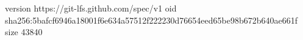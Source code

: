 version https://git-lfs.github.com/spec/v1
oid sha256:5bafcf6946a18001f6e634a57512f222230d76654eed65be98b672b640ae661f
size 43840
